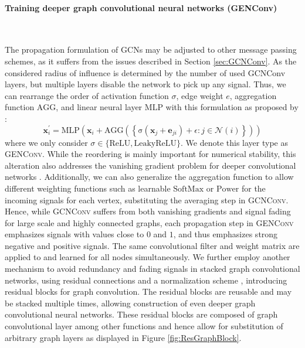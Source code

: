 \documentclass[]{article}
\renewcommand{\cite}{\citep}
\begin{document}
\paragraph{Training deeper graph convolutional neural networks (GENConv)}\mbox{}\\
\label{sec:GENConv}

The propagation formulation of GCNs may be adjusted to other message passing schemes, as it suffers from the issues described in Section \ref{sec:GCNConv}. As the considered radius of influence is determined by the number of used GCNConv layers, but multiple layers disable the network to pick up any signal. Thus, we
can rearrange the order of activation function $\sigma$, edge weight $e$, aggregation function
$\mathrm{AGG}$, and linear neural layer $\mathrm{MLP}$ with this
formulation as proposed by \cite{GENConv2020}:
\begin{equation}
	\mathbf{x}_i^{\prime} = \mathrm{MLP} \left( \mathbf{x}_i +
	\mathrm{AGG} \left( \left\{
	\mathrm{\sigma} \left( \mathbf{x}_j + \mathbf{e}_{ji} \right) +\epsilon
	: j \in \mathcal{N}(i) \right\} \right)
	\right)
\end{equation}
where we only consider
$\sigma \in \{\mathrm{ReLU}, \mathrm{LeakyReLU}\}$. We denote this layer type as \textsc{GENConv}.  While the reordering is
mainly important for numerical stability, this alteration also addresses
the vanishing gradient problem for deeper convolutional networks
\cite{GENConv2020}. Additionally, we can also generalize the
aggregation function to allow different weighting functions such as
learnable $\mathrm{SoftMax}$ or $\mathrm{Power}$ for the incoming
signals for each vertex, substituting the averaging step in
\textsc{GCNConv}. Hence, while \textsc{GCNConv} suffers from both
vanishing gradients and signal fading for large scale and highly
connected graphs, each propagation step in \textsc{GENConv} emphasizes
signals with values close to $0$ and $1$, and thus emphasizes strong negative and positive signals. The same convolutional
filter and weight matrix are applied to and learned for all nodes
simultaneously. 
We further employ another mechanism to avoid redundancy and fading
signals in stacked graph convolutional networks, using residual
connections and a normalization scheme \cite{DeepGCN2019, GENConv2020}, introducing residual blocks for graph convolution. The residual
blocks are reusable and may be stacked multiple times, allowing construction of even deeper graph convolutional neural networks. These residual blocks are composed of graph convolutional layer among other functions and hence allow for substitution of arbitrary graph layers as displayed in Figure \ref{fig:ResGraphBlock}.\\
\end{document}
